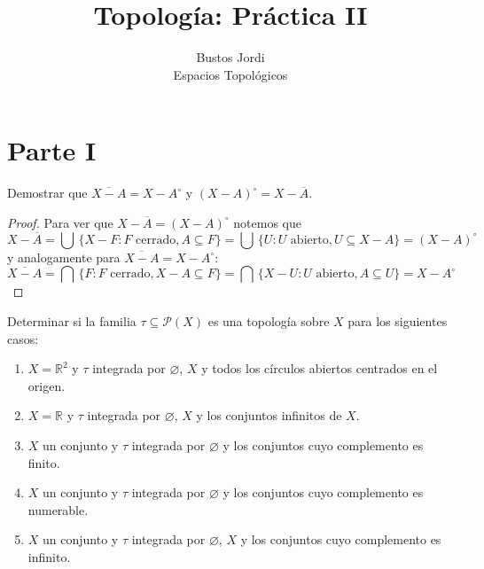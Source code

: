 \documentclass{article}
\theoremstyle{definition}
\newcommand{\R}{\mathbb{R}}
\newcommand{\cl}[1]{\overline{#1}}              %
\newcommand{\Int}[1]{{#1}^\circ}                %
\newenvironment{ejercicio}[1]{\begin{trivlist}
\item[\hskip \labelsep {\bfseries Ejercicio}\hskip \labelsep {\bfseries #1.}]}{\end{trivlist}}
\begin{document}
\title{Topología: Práctica II}
\author{Bustos Jordi\\Espacios Topológicos}

\maketitle

\section{Parte I}

\begin{ejercicio}{1}
    Demostrar que \(\overline{X-A} = X - \Int{A} \) y \({(X-A)}^\circ = X - \cl{A}\).
\end{ejercicio}

\begin{proof}
    Para ver que \( X - \cl{A} = {(X - A)}^\circ \) notemos que \[
        X - \cl{A} = \bigcup \, \{ X - F : F \text{ cerrado}, A \subseteq F \} = \bigcup \, \{ U : U \text{ abierto}, U \subseteq X - A \} = {(X - A)}^\circ
    \]
    y analogamente para \( \overline{X - A} = X - \Int{A} \): \[
        \overline{X - A} = \bigcap \, \{ F : F \text{ cerrado}, X - A \subseteq F \} = \bigcap \, \{ X - U : U \text{ abierto}, A \subseteq U \} = X - \Int{A}
    \]
\end{proof}

\begin{ejercicio}{2}
    Determinar si la familia \( \tau \subseteq \mathcal{P}(X) \) es una topología sobre \( X \) para los siguientes casos:
    \begin{enumerate}
        \item \( X=\R^{2} \) y \( \tau \) integrada por \( \varnothing \), \( X \) y todos los círculos abiertos centrados en el origen.
        \item \(X=\R \) y \(\tau \) integrada por \(\varnothing \), \(X\) y los conjuntos infinitos de \(X\).
        \item \(X\) un conjunto y \(\tau \) integrada por \(\varnothing \) y los conjuntos cuyo complemento es finito.
        \item \(X\) un conjunto y \(\tau \) integrada por \(\varnothing \) y los conjuntos cuyo complemento es numerable.
        \item \(X\) un conjunto y \(\tau \) integrada por \(\varnothing \), \(X\) y los conjuntos cuyo complemento es infinito.
    \end{enumerate}
\end{ejercicio}
\end{document}
